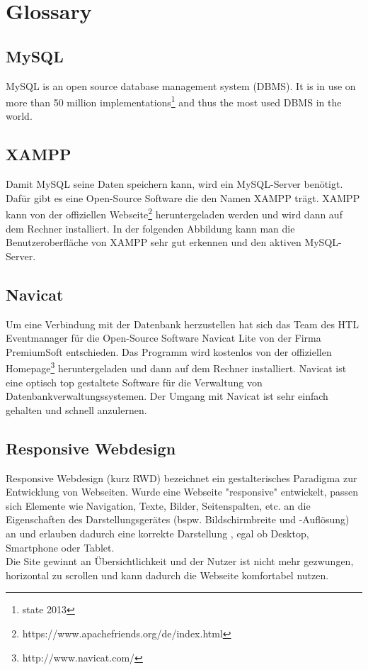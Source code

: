 \section{Glossary}
\subsection{MySQL}
MySQL is an open source database management system (DBMS). It is in use on more than 50 million implementations\footnote{state 2013} and thus the most used DBMS in the world.

\subsection{XAMPP}
Damit MySQL seine Daten speichern kann, wird ein MySQL-Server benötigt. Dafür gibt es eine Open-Source Software die den Namen XAMPP trägt. XAMPP kann von der offiziellen Webseite\footnote{https://www.apachefriends.org/de/index.html} heruntergeladen werden und wird dann auf dem Rechner installiert. In der folgenden Abbildung kann man die Benutzeroberfläche von XAMPP sehr gut erkennen und den aktiven MySQL-Server.

\subsection{Navicat}
Um eine Verbindung mit der Datenbank herzustellen  hat sich das Team des HTL Eventmanager für die Open-Source Software Navicat Lite von der Firma PremiumSoft entschieden. Das Programm wird kostenlos von der offiziellen Homepage\footnote{http://www.navicat.com/} heruntergeladen und dann auf dem Rechner installiert. Navicat ist eine optisch top gestaltete Software für die Verwaltung von Datenbankverwaltungssystemen. Der Umgang mit Navicat ist sehr einfach gehalten und schnell anzulernen.

     
     \subsection{Responsive Webdesign}
     Responsive Webdesign (kurz RWD) bezeichnet ein gestalterisches Paradigma zur Entwicklung von Webseiten. Wurde eine Webseite "responsive" entwickelt, passen sich Elemente wie Navigation, Texte, Bilder, Seitenspalten, etc. an die Eigenschaften des Darstellungsgerätes (bspw. Bildschirmbreite und -Auflösung) an und erlauben dadurch eine korrekte Darstellung , egal ob Desktop, Smartphone oder Tablet.\\
     Die Site gewinnt an Übersichtlichkeit und der Nutzer ist nicht mehr gezwungen, horizontal zu scrollen und kann dadurch die Webseite komfortabel nutzen.
     
